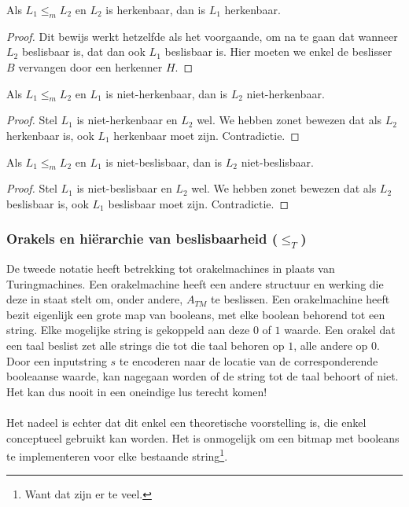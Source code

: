 \begin{theorem}
	Als $L_1 \leq_m L_2$ en $L_2$ is herkenbaar, dan is $L_1$ herkenbaar.
\end{theorem}

\begin{proof}
	Dit bewijs werkt hetzelfde als het voorgaande, om na te gaan dat wanneer $L_2$ beslisbaar is, dat dan ook $L_1$ beslisbaar is. Hier moeten we enkel de beslisser $B$ vervangen door een herkenner $H$.
\end{proof}

\begin{theorem}
	Als $L_1 \leq_m L_2$ en $L_1$ is niet-herkenbaar, dan is $L_2$ niet-herkenbaar.
\end{theorem}

\begin{proof}
	Stel $L_1$ is niet-herkenbaar en $L_2$ wel. We hebben zonet bewezen dat als $L_2$ herkenbaar is, ook $L_1$ herkenbaar moet zijn. Contradictie.
\end{proof}

\begin{theorem}
	Als $L_1 \leq_m L_2$ en $L_1$ is niet-beslisbaar, dan is $L_2$ niet-beslisbaar.
\end{theorem}

\begin{proof}
	Stel $L_1$ is niet-beslisbaar en $L_2$ wel. We hebben zonet bewezen dat als $L_2$ beslisbaar is, ook $L_1$ beslisbaar moet zijn. Contradictie.
\end{proof}

\subsubsection*{Orakels en hi\"erarchie van beslisbaarheid ($\leq_T$)}

De tweede notatie heeft betrekking tot orakelmachines in plaats van Turingmachines. Een orakelmachine heeft een andere structuur en werking die deze in staat stelt om, onder andere, $A_{TM}$ te beslissen. Een orakelmachine heeft bezit eigenlijk een grote map van booleans, met elke boolean behorend tot een string. Elke mogelijke string is gekoppeld aan deze $0$ of $1$ waarde. Een orakel dat een taal beslist zet alle strings die tot die taal behoren op $1$, alle andere op $0$. Door een inputstring $s$ te encoderen naar de locatie van de corresponderende booleaanse waarde, kan nagegaan worden of de string tot de taal behoort of niet. Het kan dus nooit in een oneindige lus terecht komen!
\\\\
Het nadeel is echter dat dit enkel een theoretische voorstelling is, die enkel conceptueel gebruikt kan worden. Het is onmogelijk om een bitmap met booleans te implementeren voor elke bestaande string\footnote{Want dat zijn er te veel.}.

